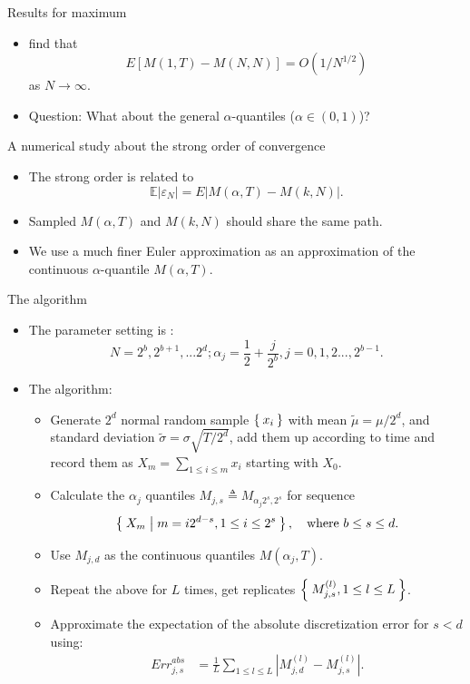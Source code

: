 \documentclass[cjk,10pt]{beamer}
\def\tmu{{\widetilde{\mu}}}
\def\tsigma{{\widetilde{\sigma}}}
\def\abs#1{{\left|#1\right|}}
\begin{document}
\begin{frame}{Results for maximum}
\begin{itemize}
\item
\cite{A-G-P-1995} find that \[E[M(1,T)-M(N,N)] = O(1/N^{1/2})\] as $N\to\infty$. 
\item
{\color{red} Question:} What about the general $\alpha$-quantiles ($\alpha \in (0,1)$)? 
\end{itemize}
\end{frame}

\begin{frame}{A numerical study about the strong order of convergence}
\begin{itemize}
\item
The strong order is related to 
\begin{equation}\label{strong-g}
\mathbb E|\varepsilon_N| =E|M(\alpha, T)-M(k,N)|.
\end{equation}
\item
Sampled $M(\alpha,T)$ and $M(k,N)$ should share the same path. 
\item
We use a much finer Euler approximation as an approximation of the continuous $\alpha$-quantile $M(\alpha, T)$. 
\end{itemize}
\end{frame}


\begin{frame}{The algorithm}
\small
\begin{itemize}
\item 
The parameter setting is : 
\begin{equation}
 N = 2^b , 2^{b+1} , ... 2^{d}; 
\alpha_j =  \frac{1}{2} + \frac{j}{2^b} , j = 0, 1 , 2..., 2^{b-1}.
\end{equation}
\item
The algorithm: 
\begin{itemize}
\item Generate $2^{d}$ normal random sample $\Set{x_i}$ 
  with mean $\tmu=\mu/2^d$,
  and standard deviation $\tsigma = \sigma \sqrt {{T}/{2^d}}$,
  add them up according to time and record them as
  $X_m = \sum_{1\leq i \leq m} x_i$ starting with $X_0$.
\item Calculate the $\alpha_j$ quantiles 
  $M_{j,s}\triangleq M_{\alpha_j 2^s,2^s}$ for sequence 
  \[
  \Set{X_m|m=i 2^{d-s}, 1\leq i\leq 2^{s}},\quad \text{where }b\leq s \leq d.\] 
\item Use $M_{j,d}$ as the continuous quantiles $M(\alpha_j,T)$.
\item Repeat the above for $L$ times,
  get replicates $\Set{M_{j,s}^{(l)},{1\leq l\leq L}}$.
\item Approximate the expectation of the absolute discretization error for $s < d$ using:
\begin{align}
Err^{abs}_{j,s} &= \frac{1}{L}\sum_{1\leq l \leq L} \abs{M_{j,d}^{(l)}- M_{j,s}^{(l)}}.
\end{align}
\end{itemize}
\end{itemize}
\end{frame}
\end{document}
